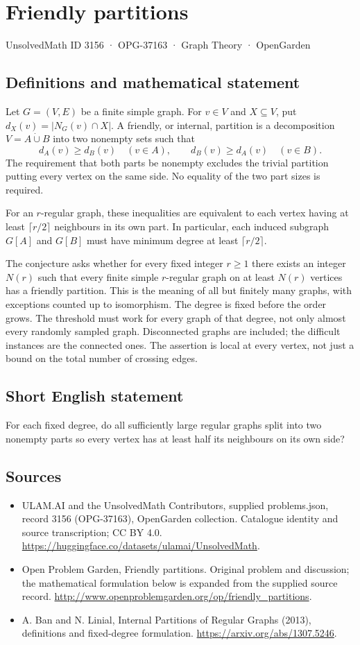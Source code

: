 \documentclass[11pt,a4paper]{article}
\begin{document}
\section*{Friendly partitions}\label{3156}
{\small UnsolvedMath ID 3156 · OPG-37163 · Graph Theory · OpenGarden}
\subsection{Definitions and mathematical statement}
Let $G=(V,E)$ be a finite simple graph. For $v\in V$ and
$X\subseteq V$, put $d_X(v)=|N_G(v)\cap X|$. A friendly, or
internal, partition is a decomposition
$V=A\mathbin{\dot\cup}B$ into two nonempty sets such that
\[
 d_A(v)\geq d_B(v)\quad(v\in A),\qquad
 d_B(v)\geq d_A(v)\quad(v\in B).
\]
The requirement that both parts be nonempty excludes the trivial
partition putting every vertex on the same side. No equality of
the two part sizes is required.

For an $r$-regular graph, these inequalities are equivalent to
each vertex having at least $\lceil r/2\rceil$ neighbours in its
own part. In particular, each induced subgraph $G[A]$ and $G[B]$
must have minimum degree at least $\lceil r/2\rceil$.

The conjecture asks whether for every fixed integer $r\geq1$
there exists an integer $N(r)$ such that every finite simple
$r$-regular graph on at least $N(r)$ vertices has a friendly
partition. This is the meaning of all but finitely many graphs,
with exceptions counted up to isomorphism. The degree is fixed
before the order grows. The threshold must work for every graph
of that degree, not only almost every randomly sampled graph.
Disconnected graphs are included; the difficult instances are
the connected ones. The assertion is local at every vertex,
not just a bound on the total number of crossing edges.
\subsection{Short English statement}
For each fixed degree, do all sufficiently large regular graphs split into two nonempty parts so every vertex has at least half its neighbours on its own side?
\subsection{Sources}
\begin{itemize}
\item[S1] ULAM.AI and the UnsolvedMath Contributors, supplied problems.json, record 3156 (OPG-37163), OpenGarden collection. Catalogue identity and source transcription; CC BY 4.0.
\url{https://huggingface.co/datasets/ulamai/UnsolvedMath}.
\item[S2] Open Problem Garden, Friendly partitions. Original problem and discussion; the mathematical formulation below is expanded from the supplied source record.
\url{http://www.openproblemgarden.org/op/friendly_partitions}.
\item[S3] A. Ban and N. Linial, Internal Partitions of Regular Graphs (2013), definitions and fixed-degree formulation.
\url{https://arxiv.org/abs/1307.5246}.
\end{itemize}
\end{document}
